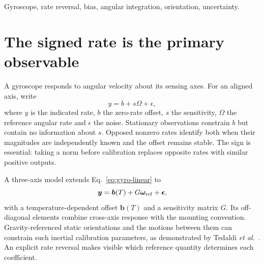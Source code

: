 \begin{abstract}
Gyroscope calibration and angle integration depend on the sign of each rate component, information that a positive magnitude trace discards. We separate these issues using records for three instruments: the LSM9DS1 in the Arduino Nano 33 BLE Sense, the IMU-3000 in the CC2541 SensorTag and a PocketLab Voyager. In the Nano record, reversal evaluated against $\pm45\unit{degree\,s^{-1}}$ reference values gives sensitivity 0.87189, close to the ratio 0.87193 between the library conversion and the datasheet sensitivity. A settled CC2541 interval averages $-200.10\unit{degree\,s^{-1}}$ and integrates to approximately $-1961^\circ$ after a local residual-offset correction; the estimated uncertainty contribution from that correction is $1.3^\circ$. In the Voyager record, the corrected $x$ integral nearly cancels to $-0.10^\circ$, although the absolute-component integral exceeds $8100^\circ$. A common rate model explains why stationary offsets, independent reference rates and actual timestamps are needed for all three instruments. The reductions support signed fixed-axis angle and accumulated-motion comparisons; final three-dimensional attitude requires an additional orientation model.
\end{abstract}
\begin{IEEEkeywords}
Gyroscope, rate reversal, bias, angular integration, orientation, uncertainty.
\end{IEEEkeywords}

\section{The signed rate is the primary observable}
A gyroscope responds to angular velocity about its sensing axes. For an aligned axis, write
\begin{equation}
 y=b+s\Omega+\epsilon,
 \label{eq:gyro-linear}
\end{equation}
where $y$ is the indicated rate, $b$ the zero-rate offset, $s$ the sensitivity, $\Omega$ the reference angular rate and $\epsilon$ the noise. Stationary observations constrain $b$ but contain no information about $s$. Opposed nonzero rates identify both when their magnitudes are independently known and the offset remains stable. The sign is essential: taking a norm before calibration replaces opposite rates with similar positive outputs.

A three-axis model extends Eq.~\ref{eq:gyro-linear} to
\begin{equation}
 \bm y=\bm b(T)+G\bm\omega_{\rm ref}+\bm\epsilon,
 \label{eq:gyro-vector}
\end{equation}
with a temperature-dependent offset $\bm b(T)$ and a sensitivity matrix $G$. Its off-diagonal elements combine cross-axis response with the mounting convention. Gravity-referenced static orientations and the motions between them can constrain such inertial calibration parameters, as demonstrated by Tedaldi \emph{et al.}~\cite{tedaldi2014}. An explicit rate reversal makes visible which reference quantity determines each coefficient.

